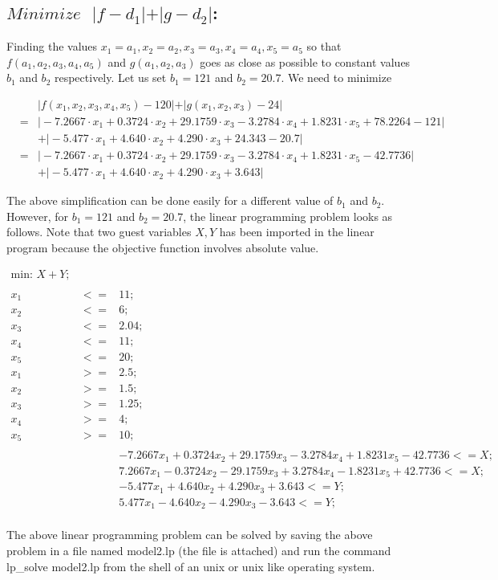 \documentclass[11pt]{article}
\begin{document}
\subsection{$Minimize \text{ } \vert f-d_1 \vert + \vert g-d_2 \vert$:} Finding the values $x_1 = a_1,x_2 = a_2,x_3 = a_3,x_4 = a_4,x_5 = a_5$ so that $f(a_1,a_2,a_3,a_4,a_5)$ and $g(a_1,a_2,a_3)$  goes as close as possible to constant values $b_1$ and $b_2$ respectively. Let us set $b_1 = 121$ and $b_2 = 20.7$. We need to minimize
\begin{tiny}
\begin{eqnarray*}
& &\vert f(x_1,x_2,x_3,x_4,x_5)-120 \vert + \vert g(x_1,x_2,x_3)-24 \vert \\ 
&=& \vert -7.2667 \cdot x_1 + 0.3724 \cdot x_2 + 29.1759 \cdot x_3 - 3.2784 \cdot x_4 + 1.8231 \cdot x_5 + 78.2264 - 121 \vert \\
& & + \vert -5.477 \cdot x_1 + 4.640 \cdot x_2 + 4.290 \cdot x_3 + 24.343 -20.7 \vert \\
& = &  \vert -7.2667 \cdot x_1 + 0.3724 \cdot x_2 + 29.1759 \cdot x_3 - 3.2784 \cdot x_4 + 1.8231 \cdot x_5 - 42.7736 \vert \\
& & + \vert -5.477 \cdot x_1 + 4.640 \cdot x_2 + 4.290 \cdot x_3 + 3.643 \vert
\end{eqnarray*}
\end{tiny}The above simplification can be done easily for a different value of $b_1$ and $b_2$. However, for $b_1=121$ and $b_2 = 20.7$, the linear programming problem looks as follows. Note that two guest variables $X,Y$ has been imported in the linear program because the objective function involves absolute value.
\begin{tiny}
\begin{eqnarray*}
\text{min: } X + Y;\\
\\
x_1 &<=& 11;\\
x_2 &<=& 6;\\
x_3 &<=& 2.04;\\
x_4 &<=& 11;\\
x_5 &<=& 20;\\
x_1 &>=& 2.5;\\
x_2 &>=& 1.5;\\
x_3 &>=& 1.25;\\
x_4 &>=& 4;\\
x_5 &>=& 10;\\
\\
& & -7.2667 x_1 + 0.3724 x_2 + 29.1759 x_3 - 3.2784 x_4 + 1.8231 x_5 - 42.7736 <= X;\\
& & 7.2667 x_1 - 0.3724 x_2 - 29.1759 x_3 + 3.2784 x_4 - 1.8231 x_5 + 42.7736 <= X;\\
& & -5.477 x_1 + 4.640 x_2 + 4.290 x_3 + 3.643 <= Y;\\
& & 5.477 x_1 - 4.640 x_2 - 4.290 x_3 - 3.643 <= Y;\\
\end{eqnarray*}
\end{tiny} The above linear programming problem can be solved by saving the above problem in a file named \textsf{model2.lp} (the file is attached) and run the command \textsf{lp\_solve model2.lp} from the shell of an unix or unix like operating system. 
\end{document}

